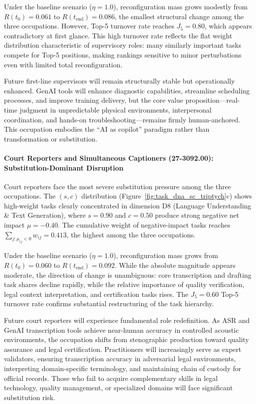 Under the baseline scenario ($\eta = 1.0$), reconfiguration mass grows modestly from $R(t_0) = 0.061$ to $R(t_{\text{end}}) = 0.086$, the smallest structural change among the three occupations. However, Top-5 turnover rate reaches $J_5 = 0.80$, which appears contradictory at first glance. This high turnover rate reflects the flat weight distribution characteristic of supervisory roles: many similarly important tasks compete for Top-5 positions, making rankings sensitive to minor perturbations even with limited total reconfiguration.

Future first-line supervisors will remain structurally stable but operationally enhanced. GenAI tools will enhance diagnostic capabilities, streamline scheduling processes, and improve training delivery, but the core value proposition---real-time judgment in unpredictable physical environments, interpersonal coordination, and hands-on troubleshooting---remains firmly human-anchored. This occupation embodies the ``AI as copilot'' paradigm rather than transformation or substitution.

\paragraph{Court Reporters and Simultaneous Captioners (27-3092.00): Substitution-Dominant Disruption}

Court reporters face the most severe substitution pressure among the three occupations. The $(s,c)$ distribution (Figure~\ref{fig:task_dna_sc_triptych}c) shows high-weight tasks clearly concentrated in dimension D8 (Language Understanding \& Text Generation), where $s = 0.90$ and $c = 0.50$ produce strong negative net impact $\mu = -0.40$. The cumulative weight of negative-impact tasks reaches $\sum_{j:\mu_{ij}<0} w_{ij} = 0.413$, the highest among the three occupations.

Under the baseline scenario ($\eta = 1.0$), reconfiguration mass grows from $R(t_0) = 0.060$ to $R(t_{\text{end}}) = 0.092$. While the absolute magnitude appears moderate, the direction of change is unambiguous: core transcription and drafting task shares decline rapidly, while the relative importance of quality verification, legal context interpretation, and certification tasks rises. The $J_5 = 0.60$ Top-5 turnover rate confirms substantial restructuring of the task hierarchy.

Future court reporters will experience fundamental role redefinition. As ASR and GenAI transcription tools achieve near-human accuracy in controlled acoustic environments, the occupation shifts from stenographic production toward quality assurance and legal certification. Practitioners will increasingly serve as expert validators, ensuring transcription accuracy in adversarial legal environments, interpreting domain-specific terminology, and maintaining chain of custody for official records. Those who fail to acquire complementary skills in legal technology, quality management, or specialized domains will face significant substitution risk.


